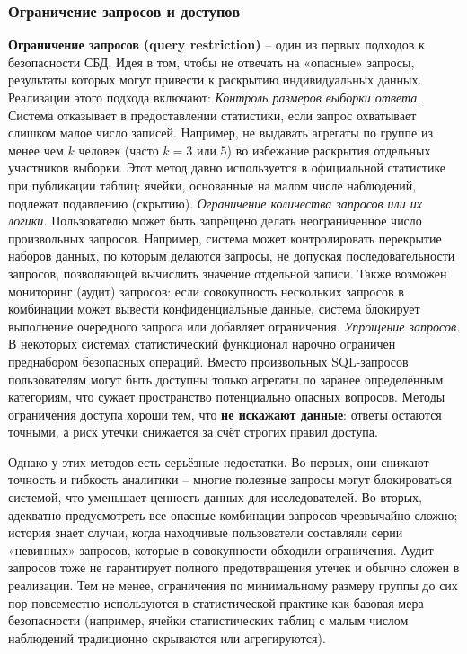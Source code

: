 \subsubsection{Ограничение запросов и доступов}

\textbf{Ограничение запросов (query restriction)} – один из первых подходов к безопасности
СБД. Идея в том, чтобы не отвечать на «опасные» запросы, результаты которых могут привести
к раскрытию индивидуальных данных. Реализации этого подхода включают: \textit{Контроль
размеров выборки ответа.} Система отказывает в предоставлении статистики, если запрос
охватывает слишком малое число записей. Например, не выдавать агрегаты по группе из менее
чем $k$ человек (часто $k=3$ или $5$) во избежание раскрытия отдельных участников выборки.
Этот метод давно используется в официальной статистике при публикации таблиц: ячейки,
основанные на малом числе наблюдений, подлежат подавлению (скрытию). \textit{Ограничение
количества запросов или их логики.} Пользователю может быть запрещено делать
неограниченное число произвольных запросов. Например, система может контролировать
перекрытие наборов данных, по которым делаются запросы, не допуская последовательности
запросов, позволяющей вычислить значение отдельной записи. Также возможен мониторинг
(аудит) запросов: если совокупность нескольких запросов в комбинации может вывести
конфиденциальные данные, система блокирует выполнение очередного запроса или добавляет
ограничения. \textit{Упрощение запросов.} В некоторых системах статистический функционал
нарочно ограничен преднабором безопасных операций. Вместо произвольных SQL-запросов
пользователям могут быть доступны только агрегаты по заранее определённым категориям, что
сужает пространство потенциально опасных вопросов. Методы ограничения доступа хороши тем,
что \textbf{не искажают данные}: ответы остаются точными, а риск утечки снижается за счёт
строгих правил доступа.

Однако у этих методов есть серьёзные недостатки. Во-первых, они снижают точность и
гибкость аналитики – многие полезные запросы могут блокироваться системой, что уменьшает
ценность данных для исследователей. Во-вторых, адекватно предусмотреть все опасные
комбинации запросов чрезвычайно сложно; история знает случаи, когда находчивые
пользователи составляли серии «невинных» запросов, которые в совокупности обходили
ограничения. Аудит запросов тоже не гарантирует полного предотвращения утечек и обычно
сложен в реализации. Тем не менее, ограничения по минимальному размеру группы до сих пор
повсеместно используются в статистической практике как базовая мера безопасности
(например, ячейки статистических таблиц с малым числом наблюдений традиционно скрываются
или агрегируются).

